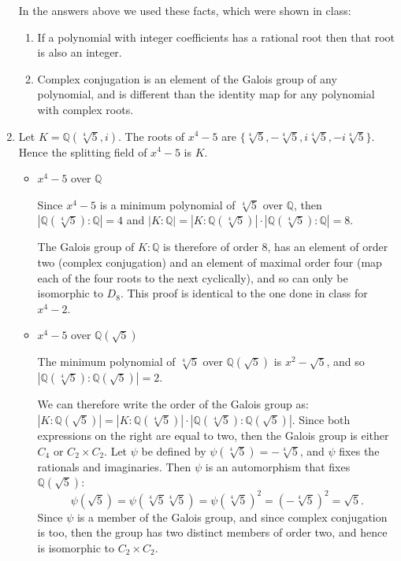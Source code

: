 \documentclass[11pt]{article} \usepackage{amssymb}
\newcommand{\Q}{\mathbb Q}
\begin{document}
\begin{enumerate}
\begin{itemize}
    \end{itemize}
    In the answers above we used these facts, which were shown in class:
    \begin{enumerate}
    \item If a 
      polynomial with integer coefficients has a rational root then that root
      is also an integer.
    \item Complex conjugation is an element of the Galois group of any 
      polynomial, and is different than the identity map for any polynomial
      with complex roots.
    \end{enumerate}
    
      
  \item
    Let $K=\Q(\sqrt[4]{5}, i)$.
    The roots of $x^4-5$ are 
    $\{\sqrt[4]{5},-\sqrt[4]{5}, i\sqrt[4]{5},-i\sqrt[4]{5}\}$.
    Hence the splitting field of $x^4-5$ is $K$.

    \begin{itemize}
    \item $x^4-5$ over $\Q$

      Since $x^4-5$ is a minimum polynomial of $\sqrt[4]{5}$ over $\Q$, then 
      $|\Q(\sqrt[4]{5}):\Q|=4$ and 
      $|K:\Q|=|K:\Q(\sqrt[4]{5})|\cdot|\Q(\sqrt[4]{5}):\Q|=8$.

      The Galois group of $K:\Q$ is therefore of order 8, has an element of
      order two (complex conjugation) and an element of maximal order four (map
      each of the four roots to the next cyclically), and so can only be 
      isomorphic to $D_8$. This proof is identical to the one done in class
      for $x^4-2$.
      
    \item $x^4-5$ over $\Q(\sqrt{5})$

      The minimum polynomial of $\sqrt[4]{5}$
      over $\Q(\sqrt{5})$ is $x^2-\sqrt{5}$, and so 
      $|\Q(\sqrt[4]{5}):\Q(\sqrt{5})|=2$. 

      We can therefore write the order of the Galois group as:
      $|K:\Q(\sqrt{5})|=|K:\Q(\sqrt[4]{5})|\cdot|\Q(\sqrt[4]{5}):\Q(\sqrt{5})|$.
      Since both expressions on the right are equal to two, then the Galois
      group is either $C_4$ or $C_2\times C_2$. Let $\psi$ be defined by 
      $\psi(\sqrt[4]{5})=-\sqrt[4]{5}$, and $\psi$ fixes the rationals and imaginaries. 
      Then $\psi$ is an automorphism that
      fixes $\Q(\sqrt{5})$:
      \begin{equation*}
        \psi(\sqrt{5})=\psi(\sqrt[4]{5}\sqrt[4]{5})=\psi(\sqrt[4]{5})^2
        = (-\sqrt[4]{5})^2=\sqrt{5}.
      \end{equation*}
      Since $\psi$ is a member of the Galois group, and since complex 
      conjugation is too, then the group has two distinct members of order
      two, and hence is isomorphic to $C_2\times C_2$.


\end{itemize}
\end{enumerate}
\end{document}
